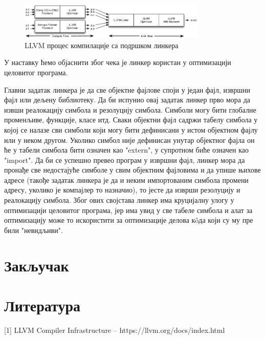 \documentclass[12pt,oneside]{memoir}
\begin{document}
\begin{figure}[!ht]
  \centering
  \includegraphics[width=0.8\textwidth]{LTO.png}
  \caption{LLVM процес компилације са подршком линкера}
  \label{fig:grafikon}
\end{figure}


У наставку ћемо објаснити због чека је линкер користан у оптимизацији целовитог програма.

Главни задатак линкера је да све објектне фајлове споји у један фајл, извршни фајл
или дељену библиотеку. 
Да би испунио овај задатак линкер прво мора да извши реалокацију симбола и резолуцију
симбола.
Симболи могу бити глобалне променљиве, функције, класе итд. 
Сваки објектни фајл садржи табелу симбола у којој се налазе сви симболи који 
могу бити дефинисани у истом објектном фајлу или у неком другом.
Уколико симбол није дефинисан унутар објектног фајла он ће у табели симбола бити
означен као "extern", у супротном биће означен као "import".
Да би се успешно превео програм у извршни фајл, линкер мора да пронађе све 
недостајуће симболе у свим објектним фајловима и да упише њихове адресе (такође задатак
линкера је да и неким импортованим симбола промени адресу, уколико је компајлер то назначио),
то јесте да изврши резолуцију и реалокацију симбола.
Због ових својстава линкер има круцијалну улогу у оптимизацији целовитог програма, јер
има увид у све табеле симбола и алат за оптимизацију може то искористити за оптимизације
делова к\^{o}да који су му пре били "невидљиви". 




\chapter{Закључак}



\backmatter
\chapter{Литература}
[1] LLVM Compiler Infrastructure -- https://llvm.org/docs/index.html \\
\end{document}
